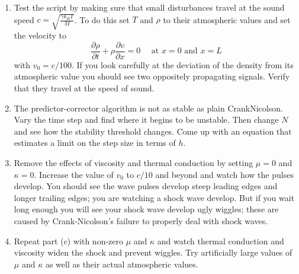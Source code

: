 \begin{problem}\label{P11.4}
\begin{enumerate}[label=(\alph*)]
\item Test the script by making sure that small disturbances travel at the sound speed $c=\sqrt{\frac{\gamma k_{B} T}{M}}$. To do this set $T$ and $\rho$ to their atmospheric values and set the velocity to 
\begin{equation}\label{eq:1131}
\frac{\partial \rho}{\partial t}+\rho \frac{\partial v}{\partial x}=0 \quad \text { at } x=0 \text { and } x=L
\end{equation}
with $v_{0}=c / 100$. If you look carefully at the deviation of the density from its atmospheric value you should see two oppositely propagating signals. Verify that they travel at the speed of sound.

\item The predictor-corrector algorithm is not as stable as plain CrankNicolson. Vary the time step and find where it begins to be unstable. Then change $N$ and see how the stability threshold changes. Come up with an equation that estimates a limit on the step size in terms of $h$.

\item Remove the effects of viscosity and thermal conduction by setting $\mu=0$ and $\kappa=0$. Increase the value of $v_{0}$ to $c / 10$ and beyond and watch how the pulses develop. You should see the wave pulses develop steep leading edges and longer trailing edges; you are watching a shock wave develop. But if you wait long enough you will see your shock wave develop ugly wiggles; these are caused by Crank-Nicolson\rq s failure to properly deal with shock waves.

\item Repeat part (c) with non-zero $\mu$ and $\kappa$ and watch thermal conduction and viscosity widen the shock and prevent wiggles. Try artificially large values of $\mu$ and $\kappa$ as well as their actual atmospheric values.
\end{enumerate}
\end{problem}
